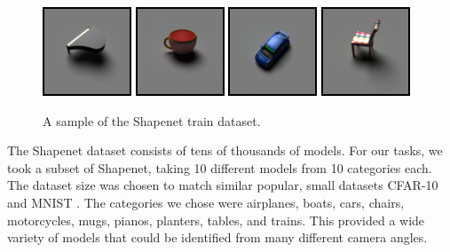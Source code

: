 \documentclass[10pt,twocolumn,letterpaper]{article}
\begin{document}
\begin{figure}[h!]
\centering
\includegraphics[width=0.24\columnwidth]{./assets/piano.jpg}
\includegraphics[width=0.24\columnwidth]{./assets/mug.jpg}
\includegraphics[width=0.24\columnwidth]{./assets/car.jpg}
\includegraphics[width=0.24\columnwidth]{./assets/chair.jpg}
\caption{A sample of the Shapenet train dataset.}
\label{fig:SHAPENET}
\end{figure}

The Shapenet dataset consists of tens of thousands of models. For our tasks, we took a subset of Shapenet, taking 10 different models from 10 categories each. The dataset size was chosen to match similar popular, small datasets CFAR-10 \cite{Krizhevsky09learningmultiple} and MNIST \cite{726791}. The categories we chose were airplanes, boats, cars, chairs, motorcycles, mugs, pianos, planters, tables, and trains. This provided a wide variety of models that could be identified from many different camera angles. 
\end{document}
